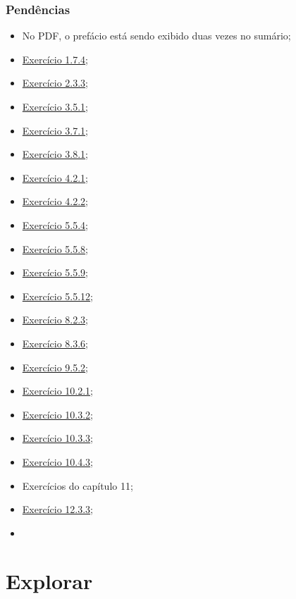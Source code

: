 \documentclass[
]{latex/krantz}
\providecommand{\tightlist}{%
  \setlength{\itemsep}{0pt}\setlength{\parskip}{0pt}}
\theoremstyle{definition}
\theoremstyle{definition}
\theoremstyle{definition}
\theoremstyle{definition}
\theoremstyle{remark}
\begin{document}
\hypertarget{penduxeancias}{%
\section*{Pendências}\label{penduxeancias}}

\begin{itemize}
\tightlist
\item
  No PDF, o prefácio está sendo exibido duas vezes no sumário;
\item
  \protect\hyperlink{exr1-7-4}{Exercício 1.7.4};
\item
  \protect\hyperlink{exr2-3-3}{Exercício 2.3.3};
\item
  \protect\hyperlink{exr3-5-1}{Exercício 3.5.1};
\item
  \protect\hyperlink{exr3-7-1}{Exercício 3.7.1};
\item
  \protect\hyperlink{exr3-8-1}{Exercício 3.8.1};
\item
  \protect\hyperlink{exr4-2-1}{Exercício 4.2.1};
\item
  \protect\hyperlink{exr4-2-2}{Exercício 4.2.2};
\item
  \protect\hyperlink{exr5-5-4}{Exercício 5.5.4};
\item
  \protect\hyperlink{exr5-5-8}{Exercício 5.5.8};
\item
  \protect\hyperlink{exr5-5-9}{Exercício 5.5.9};
\item
  \protect\hyperlink{exr5-5-12}{Exercício 5.5.12};
\item
  \protect\hyperlink{exr8-2-3}{Exercício 8.2.3};
\item
  \protect\hyperlink{exr8-3-6}{Exercício 8.3.6};
\item
  \protect\hyperlink{exr9-5-2}{Exercício 9.5.2};
\item
  \protect\hyperlink{exr10-2-1}{Exercício 10.2.1};
\item
  \protect\hyperlink{exr10-3-2}{Exercício 10.3.2};
\item
  \protect\hyperlink{exr10-3-3}{Exercício 10.3.3};
\item
  \protect\hyperlink{exr10-4-3}{Exercício 10.4.3};
\item
  Exercícios do capítulo 11;
\item
  \protect\hyperlink{exr12-3-3}{Exercício 12.3.3};
\item
\end{itemize}

\mainmatter

\hypertarget{part-explorar}{%
\part{Explorar}\label{part-explorar}}
\end{document}

